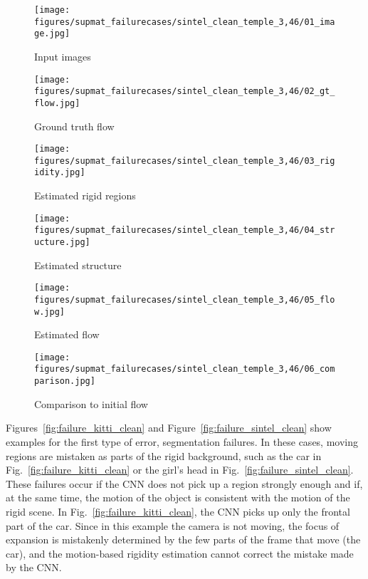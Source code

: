 \documentclass[10pt,twocolumn,letterpaper]{article}
\begin{document}
\begin{figure*}[ht!]
\captionsetup{justification=centering}
\centering
\begin{subfigure}[t]{\failurewidth}
	\texttt{[image: figures/supmat\_failurecases/sintel\_clean\_temple\_3,46/01\_image.jpg]}
	\caption{Input images}
\end{subfigure}\begin{subfigure}[t]{\failurewidth}
	\texttt{[image: figures/supmat\_failurecases/sintel\_clean\_temple\_3,46/02\_gt\_flow.jpg]}
	\caption{Ground truth flow}
\end{subfigure}\begin{subfigure}[t]{\failurewidth}
	\texttt{[image: figures/supmat\_failurecases/sintel\_clean\_temple\_3,46/03\_rigidity.jpg]}
	\caption{Estimated rigid regions}
\end{subfigure}
\begin{subfigure}[t]{\failurewidth}
	\texttt{[image: figures/supmat\_failurecases/sintel\_clean\_temple\_3,46/04\_structure.jpg]}
	\caption{Estimated structure}
\end{subfigure}\begin{subfigure}[t]{\failurewidth}
	\texttt{[image: figures/supmat\_failurecases/sintel\_clean\_temple\_3,46/05\_flow.jpg]}
	\caption{Estimated flow}
\end{subfigure}\begin{subfigure}[t]{\failurewidth}
	\texttt{[image: figures/supmat\_failurecases/sintel\_clean\_temple\_3,46/06\_comparison.jpg]}
	\caption{Comparison to initial flow}
\end{subfigure}
\caption{Failure case Sintel clean: Moving regions are wrongly detected as rigid. \\EPE initialization: $0.93$. EPE MR-Flow: $1.59$.}
\label{fig:failure_sintel_clean}
\end{figure*}

Figures~\ref{fig:failure_kitti_clean} and Figure~\ref{fig:failure_sintel_clean} show examples for the first type of error, segmentation failures.
In these cases, moving regions are mistaken as parts of the rigid background, such as the car in Fig.~\ref{fig:failure_kitti_clean} or the girl's head in Fig.~\ref{fig:failure_sintel_clean}.
These failures occur if the CNN does not pick up a region strongly enough and if, at the same time, the motion of the object is consistent with the motion of the rigid scene.
In Fig.~\ref{fig:failure_kitti_clean}, the CNN picks up only the frontal part of the car.
Since in this example the camera is not moving, the focus of expansion is mistakenly determined by the few parts of the frame that move (\ie the car), and the motion-based rigidity estimation cannot correct the mistake made by the CNN.
\end{document}
